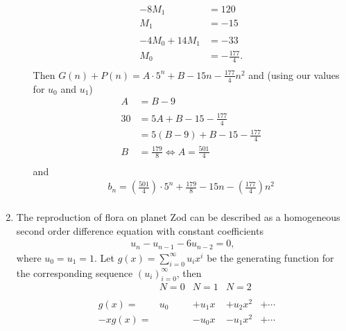 \documentclass[10pt]{article}
\begin{document}
\begin{enumerate}
\begin{enumerate}
                \begin{align*}
                    -8M_1 &= 120 \\
                    M_1 &= -15 \\
                    \\
                    -4M_0 + 14M_1 &= - 33 \\
                    M_0 &= - \tfrac{177}{4}. \\
                \end{align*}
                Then $G(n) + P(n) = A\cdot5^n + B -15n - \tfrac{177}{4}n^2$ and (using our values for $u_0$ and $u_1$)
                \begin{align*}
                    A &= B - 9 \\
                    \\
                    30 &= 5A + B - 15 - \tfrac{177}{4} \\
                    &= 5(B - 9) + B - 15 - \tfrac{177}{4} \\
                    B &= \tfrac{179}{8} \Leftrightarrow A = \tfrac{501}{4} \\
                \end{align*}
                and
                \begin{align*}
                    b_n = (\tfrac{501}{4})\cdot 5^n + \tfrac{179}{8} - 15n - (\tfrac{177}{4})n^2 \\
                \end{align*}
        \end{enumerate}
        \item The reproduction of flora on planet Zod can be described as a
            homogeneous second order difference equation with constant
            coefficients
            \begin{align*}
                u_n - u_{n - 1} - 6u_{n - 2} = 0,
            \end{align*}
            where $u_0 = u_1 = 1$. Let $g(x) = \sum_{i=0}^\infty u_ix^i$ be the
            generating function for the corresponding sequence
            $(u_i)_{i=0}^\infty$, then
            $$
            \begin{array}{rrllll}
                &       &N=0 &N=1 &N=2 \\
                \\
                &g(x) = &u_0 &+ u_1x &+ u_2x^2 &+ \cdots \\
                &-xg(x) =& &-u_0x &- u_1x^2 &+ \cdots \\

\end{array}$$
\end{enumerate}
\end{document}
